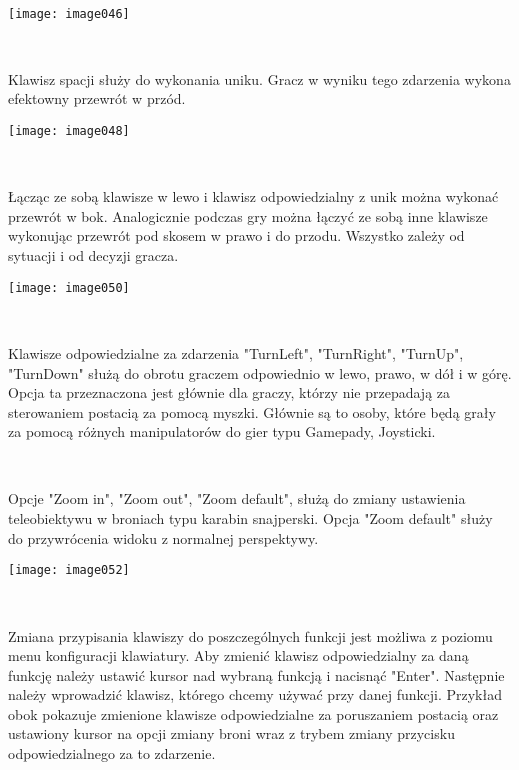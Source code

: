 \documentclass[licencjacka]{pracamgr}
\begin{document}
\begin{center}
\ \

\texttt{[image: image046]}
\end{center}

\ \

Klawisz spacji służy do wykonania uniku. Gracz w wyniku tego zdarzenia wykona efektowny przewrót w przód.

\begin{center}
\texttt{[image: image048]}
\end{center}

\ \

Łącząc ze sobą klawisze w lewo i klawisz odpowiedzialny z unik można wykonać przewrót w bok. Analogicznie podczas gry można łączyć ze sobą inne klawisze wykonując przewrót pod skosem w prawo i do przodu. Wszystko zależy od sytuacji i od decyzji gracza.

\begin{center}
\texttt{[image: image050]}
\end{center}

\ \

Klawisze odpowiedzialne za zdarzenia "TurnLeft", "TurnRight", "TurnUp", "TurnDown" służą do obrotu graczem odpowiednio w lewo, prawo, w dół i w górę. Opcja ta przeznaczona jest głównie dla graczy, którzy nie przepadają za sterowaniem postacią za pomocą myszki. Głównie są to osoby, które będą grały za pomocą różnych manipulatorów do gier typu Gamepady, Joysticki.

\ \

Opcje "Zoom in", "Zoom out", "Zoom default", służą do zmiany ustawienia teleobiektywu w broniach typu karabin snajperski. Opcja "Zoom default" służy do przywrócenia widoku z normalnej perspektywy.

\begin{center}
\texttt{[image: image052]}
\end{center}

\ \

Zmiana przypisania klawiszy do poszczególnych funkcji jest możliwa z poziomu menu konfiguracji klawiatury.
Aby zmienić klawisz odpowiedzialny za daną funkcję należy ustawić kursor nad wybraną funkcją i nacisnąć "Enter". Następnie należy wprowadzić klawisz, którego chcemy używać przy danej funkcji.
Przykład obok pokazuje zmienione klawisze odpowiedzialne za poruszaniem postacią oraz ustawiony kursor na opcji zmiany broni wraz z trybem zmiany przycisku odpowiedzialnego za to zdarzenie.
\end{document}
